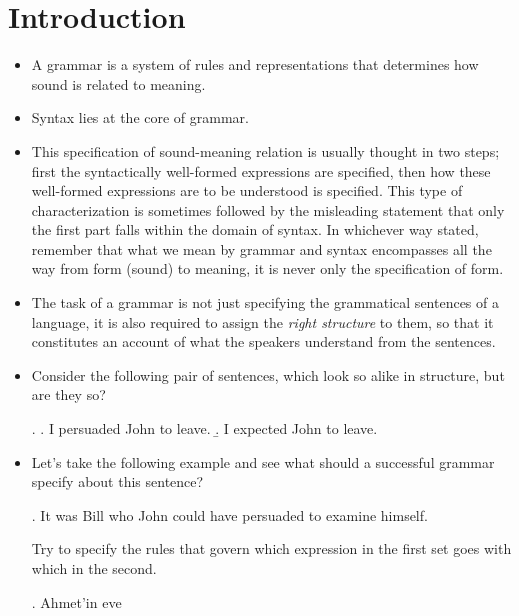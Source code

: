 \documentclass[11pt]{article}
\begin{document}
 \section{Introduction}
\begin{itemize}
\item A grammar is a system of rules and representations that determines
how sound is related to meaning. 

\item Syntax lies at the core of grammar.

\item This specification of sound-meaning relation is usually thought in two
steps; first the syntactically well-formed expressions are specified, then how
these well-formed expressions are to be understood is specified. This type of
characterization is sometimes followed by the misleading statement that only the
first part falls within the domain of syntax. In whichever
way stated, remember that what we mean by grammar and syntax encompasses all the
way from form (sound) to meaning, it is never only the specification of form.

\item  The task of a grammar is not just specifying the grammatical sentences
of a language, it is also required to assign the \emph{right structure} to them, so that it
constitutes an account of what the speakers understand from the sentences. 

\item Consider the following pair of sentences, which look so alike in structure, but are
they so?


\ex. 
\a. I persuaded John to leave.
\b. I expected John to leave.


\item Let's take the following example and see what should a successful grammar
specify about this sentence?

\ex.  It was Bill who John could have persuaded to examine himself.

\begin{uexercise}

Try to specify the rules that govern which expression in the first set goes with
which in the second.


\ex. Ahmet'in eve  


\end{uexercise}

\end{itemize} 
\end{document}
